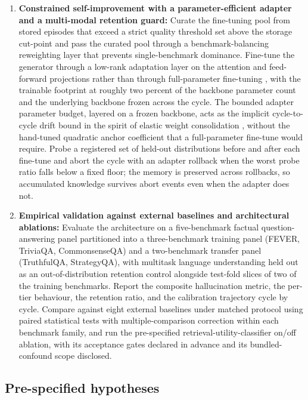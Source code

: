 \begin{enumerate}
\item \textbf{Constrained self-improvement with a parameter-efficient adapter and a multi-modal retention guard:} Curate the fine-tuning pool from stored episodes that exceed a strict quality threshold set above the storage cut-point and pass the curated pool through a benchmark-balancing reweighting layer that prevents single-benchmark dominance. Fine-tune the generator through a low-rank adaptation layer on the attention and feed-forward projections rather than through full-parameter fine-tuning \cite{hu2022lora}, with the trainable footprint at roughly two percent of the backbone parameter count and the underlying backbone frozen across the cycle. The bounded adapter parameter budget, layered on a frozen backbone, acts as the implicit cycle-to-cycle drift bound in the spirit of elastic weight consolidation \cite{doi:10.1073/pnas.1611835114}, without the hand-tuned quadratic anchor coefficient that a full-parameter fine-tune would require. Probe a registered set of held-out distributions before and after each fine-tune and abort the cycle with an adapter rollback when the worst probe ratio falls below a fixed floor; the memory is preserved across rollbacks, so accumulated knowledge survives abort events even when the adapter does not.

\item \textbf{Empirical validation against external baselines and architectural ablations:} Evaluate the architecture on a five-benchmark factual question-answering panel partitioned into a three-benchmark training panel (FEVER, TriviaQA, CommonsenseQA) and a two-benchmark transfer panel (TruthfulQA, StrategyQA), with multitask language understanding held out as an out-of-distribution retention control alongside test-fold slices of two of the training benchmarks. Report the composite hallucination metric, the per-tier behaviour, the retention ratio, and the calibration trajectory cycle by cycle. Compare against eight external baselines under matched protocol using paired statistical tests with multiple-comparison correction within each benchmark family, and run the pre-specified retrieval-utility-classifier on/off ablation, with its acceptance gates declared in advance and its bundled-confound scope disclosed.
\end{enumerate}

\subsection{Pre-specified hypotheses}
\label{sec:hypotheses}

